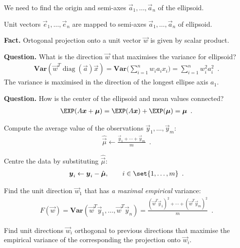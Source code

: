 \documentclass[landscape,footrule]{foils}
\renewcommand{\VAR}{\mathbf{Var}}
\DeclareMathOperator{\diag}{diag}
\begin{document}
\begin{triangles}
\item We need to find the origin and semi-axes $\vec{a}_1,\ldots,\vec{a}_n$ of the ellipsoid.
\item Unit vectors $\vec{e}_1,\ldots,\vec{e}_n$ are mapped to semi-axes $\vec{a}_1,\ldots,\vec{a}_n$ of ellipsoid.
\end{triangles}



\textbf{Fact.} Ortogonal projection onto a unit vector $\vec{w}$  is given by scalar product.\vspace*{0.5cm}

\textbf{Question.} What is the direction $\vec{w}$ that maximises the variance for ellipsoid?
\begin{align*}
\VAR(\vec{w}^T \diag(\vec{a})\vec{x})=\VAR\Biggl(\sum_{i=1}^n w_i a_i x_i\Biggr)= \sum_{i=1}^n w_i^2 a_i^2\enspace. 
\end{align*}
The variance is maximised in the direction of the longest ellipse axis $a_1$. \vspace*{0.5cm}


\textbf{Question.}
How is the center of the ellipsoid and mean values connected?
\begin{align*}
\EXP(A\vec{x}+\vec{\mu})=\EXP(A\vec{x})+\EXP(\vec{\mu})= \vec{\mu}\enspace. 
\end{align*}



\begin{triangles}
\item Compute the average value of the observations $\vec{y}_1,\ldots,\vec{y}_m$: 
\begin{align*}
\hat{\vec{\mu}}\gets\frac{\vec{y}_1+\cdots+\vec{y}_m}{m}\enspace.
\end{align*}
\item Centre the data by substituting $\hat{\vec{\mu}}$:
\begin{align*}
\vec{y}_i\gets \vec{y}_i-\hat{\vec{\mu}},\qquad i\in\set{1,\ldots,m}\enspace.
\end{align*}
\item Find the unit direction $\vec{w}_1$ that has \emph{a maximal empirical} variance: 
\begin{align*}
F(\vec{w})=\VAR(\vec{w}^T\vec{y}_1,\ldots,\vec{w}^T\vec{y}_n)=\frac{(\vec{w}^T\vec{y}_1)^2+\cdots+ (\vec{w}^T\vec{y}_m)^2}{m}\enspace.
\end{align*}
\item Find unit directions $\vec{w}_i$ orthogonal to previous directions that maximise the empirical variance of the corresponding the projection onto $\vec{w}_i$.  
\end{triangles}
\end{document}
